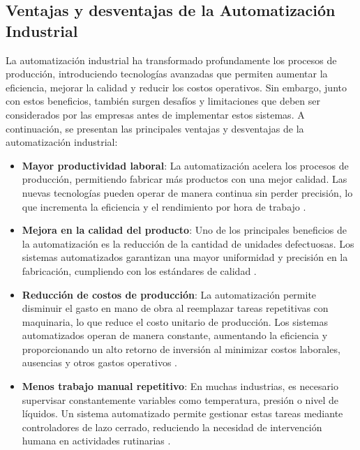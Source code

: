 \subsection{Ventajas y desventajas de la Automatización Industrial}

La automatización industrial ha transformado profundamente los procesos de producción, introduciendo tecnologías avanzadas que permiten aumentar la eficiencia, mejorar la calidad y reducir los costos operativos. Sin embargo, junto con estos beneficios, también surgen desafíos y limitaciones que deben ser considerados por las empresas antes de implementar estos sistemas. A continuación, se presentan las principales ventajas y desventajas de la automatización industrial:

\begin{itemize}

 \item \textbf{Mayor productividad laboral}: La automatización acelera los procesos de producción, permitiendo fabricar más productos con una mejor calidad. Las nuevas tecnologías pueden operar de manera continua sin perder precisión, lo que incrementa la eficiencia y el rendimiento por hora de trabajo  \cite{des_ventajas_1}.

 \item \textbf{Mejora en la calidad del producto}: Uno de los principales beneficios de la automatización es la reducción de la cantidad de unidades defectuosas. Los sistemas automatizados garantizan una mayor uniformidad y precisión en la fabricación, cumpliendo con los estándares de calidad \cite{des_ventajas_2}.
   
\item \textbf{Reducción de costos de producción}: La automatización permite disminuir el gasto en mano de obra al reemplazar tareas repetitivas con maquinaria, lo que reduce el costo unitario de producción. Los sistemas automatizados operan de manera constante, aumentando la eficiencia y proporcionando un alto retorno de inversión al minimizar costos laborales, ausencias y otros gastos operativos \cite{des_ventajas_1}.

\item \textbf{Menos trabajo manual repetitivo}: En muchas industrias, es necesario supervisar constantemente variables como temperatura, presión o nivel de líquidos. Un sistema automatizado permite gestionar estas tareas mediante controladores de lazo cerrado, reduciendo la necesidad de intervención humana en actividades rutinarias \cite{des_ventajas_1}.


\end{itemize}
